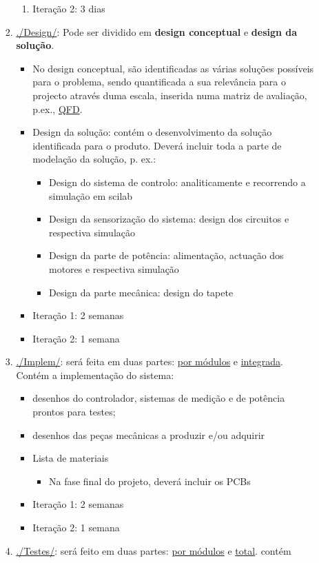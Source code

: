 \documentclass[11pt]{article}
\begin{document}
\begin{enumerate}
\begin{enumerate}
\begin{enumerate}
\begin{enumerate}
\item Iteração 2: 3 dias
\end{enumerate}
\item \href{Design}{./Design/}: Pode ser dividido em \textbf{design conceptual} e \textbf{design da
solução}. 
\begin{itemize}
\item No design conceptual, são identificadas as várias soluções possíveis
para o problema, sendo quantificada a sua relevância para o projecto
através duma escala, inserida numa matriz de avaliação, p.ex., \href{https://en.wikipedia.org/wiki/Quality\_function\_deployment}{QFD}.
\item Design da solução: contém o desenvolvimento da solução identificada
para o produto. Deverá incluir toda a parte de modelação da solução,
p. ex.:
\begin{itemize}
\item Design do sistema de controlo: analiticamente e recorrendo a
simulação em scilab
\item Design da sensorização do sistema: design dos circuitos e respectiva
simulação
\item Design da parte de potência: alimentação, actuação dos motores e
respectiva simulação
\item Design da parte mecânica: design do tapete
\end{itemize}
\item Iteração 1: 2 semanas
\item Iteração 2: 1 semana
\end{itemize}
\item \href{Implem}{./Implem/}: será feita em duas partes: \uline{por módulos} e \uline{integrada}. Contém
a implementação do sistema: 
\begin{itemize}
\item desenhos do controlador, sistemas de medição e de potência prontos para
testes;
\item desenhos das peças mecânicas a produzir e/ou adquirir
\item Lista de materiais
\begin{itemize}
\item Na fase final do projeto, deverá incluir os PCBs
\end{itemize}
\item Iteração 1: 2 semanas
\item Iteração 2: 1 semana
\end{itemize}
\item \href{Testes}{./Testes/}: será feito em duas partes: \uline{por módulos} e \uline{total}. contém

\end{enumerate}
\end{enumerate}
\end{enumerate}
\end{document}

